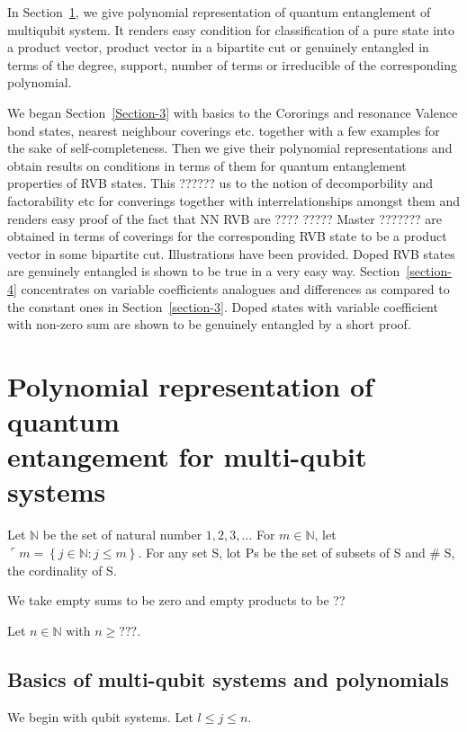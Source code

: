 \documentclass[a4paper,12pt]{article}
\theoremstyle{definition}
\theoremstyle{underlinethm}
\theoremstyle{underline}
\begin{document}
In Section~\ref{section-2}, we give polynomial representation of quantum entanglement of multiqubit system. It renders easy condition for classification of a pure state into a product vector, product vector in a bipartite cut or genuinely entangled in terms of the degree, support, number of terms or irreducible  of the corresponding polynomial.   

We began Section~\ref{Section-3} with basics to the Cororings and resonance Valence bond states, nearest neighbour coverings etc. together with a few examples for the sake of self-completeness. Then we give their polynomial representations and obtain results on conditions in terms of them for quantum entanglement properties of RVB states. This ?????? us to the notion of decomporbility  and factorability  etc for converings together with interrelationships amongst them and renders easy proof of the fact that NN RVB are ???? ????? Master ??????? are obtained in terms of coverings for the corresponding RVB state to be a product vector in some bipartite cut. Illustrations have been provided. Doped RVB states are genuinely entangled is shown to be true in a very easy way. Section~\ref{section-4} concentrates on variable coefficients analogues and differences as compared to the constant ones in Section~\ref{section-3}. Doped states with variable coefficient with non-zero sum are shown to be genuinely entangled by a short proof.


\section{Polynomial representation of quantum\\ entangement for multi-qubit systems}\label{section-2}

Let $\mathbb{N}$ be the set of natural number $1,2,3, \ldots$ For $m\in \mathbb{N}$, let $\ulcorner m= \left\{ j \in \mathbb{N} : j \leq m \right\}$. For any set S, lot Ps be the set of subsets of S and $\#$ S, the cordinality of S.

We take empty sums to be zero and empty products to be ??

Let $n \in \mathbb{N}$ with $n \geq ???$.

\subsection{Basics of multi-qubit systems and polynomials}\label{subsection-2.1}

We begin with qubit systems. Let $l \leq j \leq n.$ 
\end{document}
